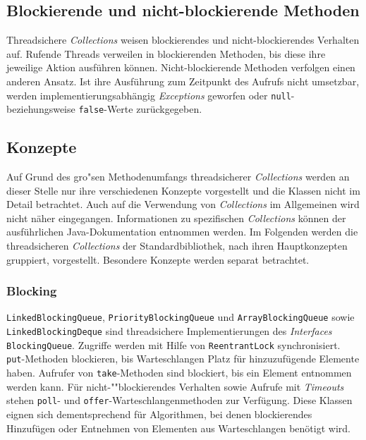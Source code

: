 \documentclass[a4paper, 11pt]{article}
\begin{document}
\subsection{Blockierende und nicht-blockierende Methoden}
\label{subsec:collections:methods}

Threadsichere \textit{Collections} weisen blockierendes und nicht-blockierendes Verhalten auf.
Rufende Threads verweilen in blockierenden Methoden, bis diese ihre jeweilige Aktion ausführen können.
Nicht-blockierende Methoden verfolgen einen anderen Ansatz.
Ist ihre Ausführung zum Zeitpunkt des Aufrufs nicht umsetzbar, werden implementierungsabhängig \textit{Exceptions} geworfen oder \verb|null|- beziehungsweise \verb|false|-Werte zurückgegeben.

\subsection{Konzepte}
\label{subsec:collections:concepts}

Auf Grund des gro"sen Methodenumfangs threadsicherer \textit{Collections} werden an dieser Stelle nur ihre verschiedenen Konzepte vorgestellt und die Klassen nicht im Detail betrachtet.
Auch auf die Verwendung von \textit{Collections} im Allgemeinen wird nicht näher eingegangen.
Informationen zu spezifischen \textit{Collections} können der ausführlichen Java-Dokumentation entnommen werden.
Im Folgenden werden die threadsicheren \textit{Collections} der Standardbibliothek, nach ihren Hauptkonzepten gruppiert, vorgestellt.
Besondere Konzepte werden separat betrachtet.

\subsubsection{Blocking}
\label{subsubsec:collections:concepts:blocking}

\verb|LinkedBlockingQueue|, \verb|PriorityBlockingQueue| und \verb|ArrayBlockingQueue| sowie \verb|LinkedBlockingDeque| sind threadsichere Implementierungen des \textit{Interfaces} \verb|BlockingQueue|.
Zugriffe werden mit Hilfe von \verb|ReentrantLock| synchronisiert.
\verb|put|-Methoden blockieren, bis Warteschlangen Platz für hinzuzufügende Elemente haben.
Aufrufer von \verb|take|-Methoden sind blockiert, bis ein Element entnommen werden kann.
Für nicht-""blockierendes Verhalten sowie Aufrufe mit \textit{Timeouts} stehen \verb|poll|- und \verb|offer|-Warteschlangenmethoden zur Verfügung.
Diese Klassen eignen sich dementsprechend für Algorithmen, bei denen blockierendes Hinzufügen oder Entnehmen von Elementen aus Warteschlangen benötigt wird.
\end{document}
